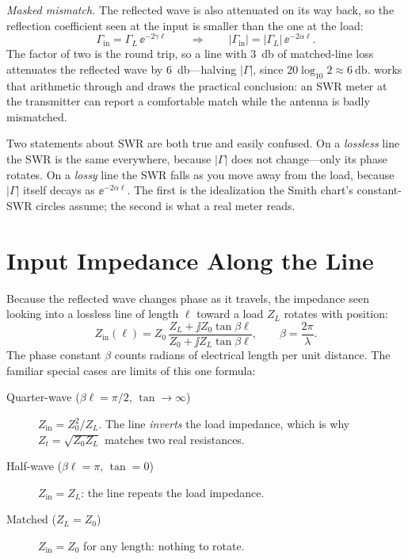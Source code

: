 \emph{Masked mismatch.} The reflected wave is also attenuated on its way back, so
the reflection coefficient seen at the input is smaller than the one at the load:
\[
\Gamma_{\mathrm{in}}=\Gamma_L\,\ee^{-2\gamma\ell}
\qquad\Longrightarrow\qquad
|\Gamma_{\mathrm{in}}|=|\Gamma_L|\,\ee^{-2\alpha\ell} .
\]
The factor of two is the round trip, so a line with \SI{3}{\decibel} of matched-line
loss attenuates the reflected wave by \SI{6}{\decibel}---halving \(|\Gamma|\), since
\(20\log_{10}2\approx\SI{6}{\decibel}\).  works that arithmetic
through and draws the practical conclusion: an SWR meter at the transmitter can
report a comfortable match while the antenna is badly mismatched.

\begin{mistakebox}
Two statements about SWR are both true and easily confused. On a \emph{lossless}
line the SWR is the same everywhere, because \(|\Gamma|\) does not change---only its
phase rotates. On a \emph{lossy} line the SWR falls as you move away from the load,
because \(|\Gamma|\) itself decays as \(\ee^{-2\alpha\ell}\). The first is the
idealization the Smith chart's constant-SWR circles assume; the second is what a
real meter reads.
\end{mistakebox}

\section{Input Impedance Along the Line}
Because the reflected wave changes phase as it travels, the impedance seen
looking into a lossless line of length \(\ell\) toward a load \(Z_L\) rotates with
position:
\[
Z_{\mathrm{in}}(\ell)=Z_0\,
\frac{Z_L+\jj Z_0\tan\beta\ell}{Z_0+\jj Z_L\tan\beta\ell},
\qquad
\beta=\frac{2\pi}{\lambda}.
\]
The phase constant \(\beta\) counts radians of electrical length per unit
distance. The familiar special cases are limits of this one formula:
\begin{description}
\item[Quarter-wave (\(\beta\ell=\pi/2\), \(\tan\to\infty\))]
\(Z_{\mathrm{in}}=Z_0^2/Z_L\). The line \emph{inverts} the load impedance, which
is why \(Z_t=\sqrt{Z_0 Z_L}\) matches two real resistances.
\item[Half-wave (\(\beta\ell=\pi\), \(\tan=0\))] \(Z_{\mathrm{in}}=Z_L\): the line
repeats the load impedance.
\item[Matched (\(Z_L=Z_0\))] \(Z_{\mathrm{in}}=Z_0\) for any length: nothing to
rotate.
\end{description}
